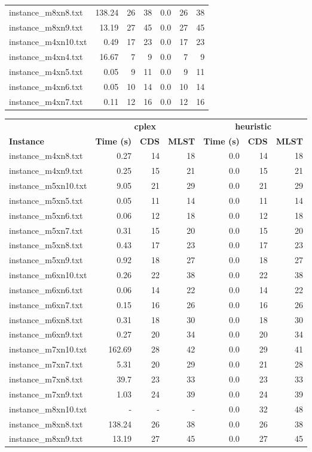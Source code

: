 \documentclass{article}
\begin{document}
\begin{center}
\begin{tabular}{lrrrrrr}
instance\_m8xn8.txt & 138.24 & 26 & 38
 & 0.0 & 26 & 38
\\
instance\_m8xn9.txt & 13.19 & 27 & 45
 & 0.0 & 27 & 45
\\
instance\_m4xn10.txt & 0.49 & 17 & 23
 & 0.0 & 17 & 23
\\
instance\_m4xn4.txt & 16.67 & 7 & 9
 & 0.0 & 7 & 9
\\
instance\_m4xn5.txt & 0.05 & 9 & 11
 & 0.0 & 9 & 11
\\
instance\_m4xn6.txt & 0.05 & 10 & 14
 & 0.0 & 10 & 14
\\
instance\_m4xn7.txt & 0.11 & 12 & 16
 & 0.0 & 12 & 16
\\
\hline\end{tabular}
\end{center}
\newpage
\begin{center}
\renewcommand{\arraystretch}{1.4}
 \begin{tabular}{lrrrrrr}
	\hline
 & \multicolumn{3}{c}{\textbf{cplex}} & \multicolumn{3}{c}{\textbf{heuristic}}\\
\textbf{Instance}  & \textbf{Time (s)} & \textbf{CDS} & \textbf{MLST}   & \textbf{Time (s)} & \textbf{CDS} & \textbf{MLST}  \\\hline

instance\_m4xn8.txt & 0.27 & 14 & 18
 & 0.0 & 14 & 18
\\
instance\_m4xn9.txt & 0.25 & 15 & 21
 & 0.0 & 15 & 21
\\
instance\_m5xn10.txt & 9.05 & 21 & 29
 & 0.0 & 21 & 29
\\
instance\_m5xn5.txt & 0.05 & 11 & 14
 & 0.0 & 11 & 14
\\
instance\_m5xn6.txt & 0.06 & 12 & 18
 & 0.0 & 12 & 18
\\
instance\_m5xn7.txt & 0.31 & 15 & 20
 & 0.0 & 15 & 20
\\
instance\_m5xn8.txt & 0.43 & 17 & 23
 & 0.0 & 17 & 23
\\
instance\_m5xn9.txt & 0.92 & 18 & 27
 & 0.0 & 18 & 27
\\
instance\_m6xn10.txt & 0.26 & 22 & 38
 & 0.0 & 22 & 38
\\
instance\_m6xn6.txt & 0.06 & 14 & 22
 & 0.0 & 14 & 22
\\
instance\_m6xn7.txt & 0.15 & 16 & 26
 & 0.0 & 16 & 26
\\
instance\_m6xn8.txt & 0.31 & 18 & 30
 & 0.0 & 18 & 30
\\
instance\_m6xn9.txt & 0.27 & 20 & 34
 & 0.0 & 20 & 34
\\
instance\_m7xn10.txt & 162.69 & 28 & 42
 & 0.0 & 29 & 41
\\
instance\_m7xn7.txt & 5.31 & 20 & 29
 & 0.0 & 21 & 28
\\
instance\_m7xn8.txt & 39.7 & 23 & 33
 & 0.0 & 23 & 33
\\
instance\_m7xn9.txt & 1.03 & 24 & 39
 & 0.0 & 24 & 39
\\
instance\_m8xn10.txt & - & - & - 
 & 0.0 & 32 & 48
\\
instance\_m8xn8.txt & 138.24 & 26 & 38
 & 0.0 & 26 & 38
\\
instance\_m8xn9.txt & 13.19 & 27 & 45
 & 0.0 & 27 & 45
\\
\hline\end{tabular}
\end{center}
\end{document}
